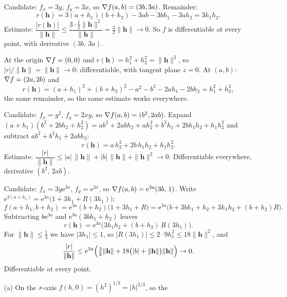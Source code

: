 \begin{solutions}
  \item Candidate: $f_{x}=3y$, $f_{y}=3x$, so $\nabla f(a,b)=(3b,3a)$.
        Remainder:
        \[
          r(\mathbf{h})=3(a+h_{1})(b+h_{2})-3ab-3bh_{1}-3ah_{2}=3h_{1}h_{2} .
        \]
        Estimate:
        $\dfrac{|r(\mathbf{h})|}{\|\mathbf{h}\|}\le\dfrac{3\cdot\frac12
        \|\mathbf{h}\|^{2}}{\|\mathbf{h}\|}=\tfrac32\|\mathbf{h}\|\to0$.
        So $f$ is differentiable at every point, with derivative
        $(3b,\,3a)$.
  \item At the origin $\nabla f=(0,0)$ and
        $r(\mathbf{h})=h_{1}^{2}+h_{2}^{2}=\|\mathbf{h}\|^{2}$, so
        $|r|/\|\mathbf{h}\|=\|\mathbf{h}\|\to0$: differentiable, with tangent
        plane $z=0$. At $(a,b)$: $\nabla f=(2a,2b)$ and
        \[
          r(\mathbf{h})=(a+h_{1})^{2}+(b+h_{2})^{2}-a^{2}-b^{2}-2ah_{1}-2bh_{2}
          =h_{1}^{2}+h_{2}^{2},
        \]
        the same remainder, so the same estimate works everywhere.
  \item Candidate: $f_{x}=y^{2}$, $f_{y}=2xy$, so $\nabla f(a,b)=(b^{2},2ab)$.
        Expand $(a+h_{1})(b^{2}+2bh_{2}+h_{2}^{2})
        =ab^{2}+2abh_{2}+ah_{2}^{2}+b^{2}h_{1}+2bh_{1}h_{2}+h_{1}h_{2}^{2}$
        and subtract $ab^{2}+b^{2}h_{1}+2abh_{2}$:
        \[
          r(\mathbf{h})=a\,h_{2}^{2}+2b\,h_{1}h_{2}+h_{1}h_{2}^{2} .
        \]
        Estimate:
        $\dfrac{|r|}{\|\mathbf{h}\|}\le|a|\,\|\mathbf{h}\|
        +|b|\,\|\mathbf{h}\|+\|\mathbf{h}\|^{2}\to0$. Differentiable
        everywhere, derivative $(b^{2},\,2ab)$.
  \item Candidate: $f_{x}=3y\mathrm{e}^{3x}$, $f_{y}=\mathrm{e}^{3x}$, so
        $\nabla f(a,b)=\mathrm{e}^{3a}(3b,\,1)$. Write
        $\mathrm{e}^{3(a+h_{1})}=\mathrm{e}^{3a}\bigl(1+3h_{1}+R(3h_{1})\bigr)$:
        \[
          f(a+h_{1},b+h_{2})=\mathrm{e}^{3a}(b+h_{2})\bigl(1+3h_{1}+R\bigr)
          =\mathrm{e}^{3a}\bigl(b+3bh_{1}+h_{2}+3h_{1}h_{2}+(b+h_{2})R\bigr).
        \]
        Subtracting $b\mathrm{e}^{3a}$ and $\mathrm{e}^{3a}(3bh_{1}+h_{2})$
        leaves
        \[
          r(\mathbf{h})=\mathrm{e}^{3a}\bigl(3h_{1}h_{2}+(b+h_{2})\,R(3h_{1})\bigr).
        \]
        For $\|\mathbf{h}\|\le\tfrac13$ we have $|3h_{1}|\le1$, so
        $|R(3h_{1})|\le2\cdot9h_{1}^{2}\le18\|\mathbf{h}\|^{2}$, and
        \[
          \frac{|r|}{\|\mathbf{h}\|}\le\mathrm{e}^{3a}\Bigl(\tfrac32
          \|\mathbf{h}\|+18\bigl(|b|+\|\mathbf{h}\|\bigr)\|\mathbf{h}\|\Bigr)
          \to0 .
        \]
        Differentiable at every point.
  \item (a) On the $x$-axis $f(h,0)=(h^{2})^{1/3}=|h|^{2/3}$, so the

\end{solutions}

